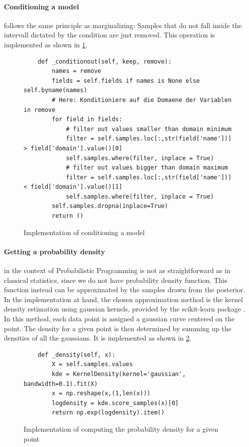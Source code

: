 \documentclass{article}
\begin{document}
\paragraph{Conditioning a model} follows the same principle as marginalizing: Samples that do not fall inside the intervall dictated by the condition are just removed. This operation is implemented as shown in \ref{fig:code_conditioning_a_model}.
\begin{figure}[h]
	\begin{lstlisting}
    def _conditionout(self, keep, remove):
		names = remove
		fields = self.fields if names is None else self.byname(names)
		# Here: Konditioniere auf die Domaene der Variablen in remove
		for field in fields:
			# filter out values smaller than domain minimum
			filter = self.samples.loc[:,str(field['name'])] > field['domain'].value()[0]
			self.samples.where(filter, inplace = True)
			# filter out values bigger than domain maximum
			filter = self.samples.loc[:,str(field['name'])] < field['domain'].value()[1]
			self.samples.where(filter, inplace = True)
		self.samples.dropna(inplace=True)
		return ()
	\end{lstlisting}
	\caption[Implementation of conditioning a model]{Implementation of conditioning a model}
	\label{fig:code_conditioning_a_model}
\end{figure}

\paragraph{Getting a probability density} in the context of Probabilistic Programming is not as straightforward as in classical statistics, since we do not have probability density function. This function instead can be approximated by the samples drawn from the posterior. In the implementation at hand, the chosen approximation method is the kernel density estimation using gaussian kernels, provided by the scikit-learn package \cite{scikit-learn}. In this method, each data point is assigned a gaussian curve centered on the point. The density for a given point is then determined by summing up the densities of all the gaussians. It is implemented as shown in \ref{fig:code_probability_density}.
\begin{figure}[h]
	\begin{lstlisting}
    def _density(self, x):
		X = self.samples.values
		kde = KernelDensity(kernel='gaussian', bandwidth=0.1).fit(X)
		x = np.reshape(x,(1,len(x)))
		logdensity = kde.score_samples(x)[0]
		return np.exp(logdensity).item()
	\end{lstlisting}
	\caption[Implementation of computing the probability density for a given point]{Implementation of computing the probability density for a given point}
	\label{fig:code_probability_density}
\end{figure}
\end{document}
